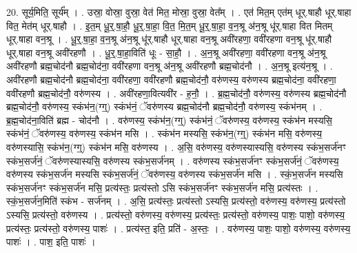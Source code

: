 \documentclass[17pt]{extarticle}
\begin{document}
20. सूर्य॒मिति॒ सूर्य᳚म् । . उस्रा॒ वोस्रा॒ वुस्रा॒ वेत॑ मित॒ मोस्रा॒ वुस्रा॒ वेत᳚म् । . एत॑ मित॒म् एत॑म् धूर्.षाहौ धूर्.षाहा वित॒ मेत॑म् धूर्.षाहौ । . इ॒त॒म् धू॒र्॒.षा॒हौ॒ धू॒र्॒.षा॒हा॒ वि॒त॒ मि॒त॒म् धू॒र्॒.षा॒हा॒ व॒न॒श्रू अ॑न॒श्रू धू॑र्.षाहा वित मितम् धूर्.षाहा वन॒श्रू । . धू॒र्॒.षा॒हा॒ व॒न॒श्रू अ॑न॒श्रू धू॑र्.षाहौ धूर्.षाहा वन॒श्रू अवी॑रहणा॒ ववी॑रहणा वन॒श्रू धू॑र्.षाहौ धूर्.षाहा वन॒श्रू अवी॑रहणौ । . धू॒र्॒.षा॒हा॒विति॑ धूः - सा॒हौ॒ । . अ॒न॒श्रू अवी॑रहणा॒ ववी॑रहणा वन॒श्रू अ॑न॒श्रू अवी॑रहणौ ब्रह्म॒चोद॑नौ ब्रह्म॒चोद॑ना॒ ववी॑रहणा वन॒श्रू अ॑न॒श्रू अवी॑रहणौ ब्रह्म॒चोद॑नौ । . अ॒न॒श्रू इत्य॑न॒श्रू । . अवी॑रहणौ ब्रह्म॒चोद॑नौ ब्रह्म॒चोद॑ना॒ ववी॑रहणा॒ ववी॑रहणौ ब्रह्म॒चोद॑नौ॒ वरु॑णस्य॒ वरु॑णस्य ब्रह्म॒चोद॑ना॒ ववी॑रहणा॒ ववी॑रहणौ ब्रह्म॒चोद॑नौ॒ वरु॑णस्य । . अवी॑रहणा॒वित्यवी॑र - ह॒नौ॒ । . ब्र॒ह्म॒चोद॑नौ॒ वरु॑णस्य॒ वरु॑णस्य ब्रह्म॒चोद॑नौ ब्रह्म॒चोद॑नौ॒ वरु॑णस्य॒ स्कंभ॑न॒(ग्ग्॒) स्कंभ॑नं॒ ॅवरु॑णस्य ब्रह्म॒चोद॑नौ ब्रह्म॒चोद॑नौ॒ वरु॑णस्य॒ स्कंभ॑नम् । . ब्र॒ह्म॒चोद॑ना॒विति॑ ब्रह्म - चोद॑नौ । . वरु॑णस्य॒ स्कंभ॑न॒(ग्ग्॒) स्कंभ॑नं॒ ॅवरु॑णस्य॒ वरु॑णस्य॒ स्कंभ॑न मस्यसि॒ स्कंभ॑नं॒ ॅवरु॑णस्य॒ वरु॑णस्य॒ स्कंभ॑न मसि । . स्कंभ॑न मस्यसि॒ स्कंभ॑न॒(ग्ग्॒) स्कंभ॑न मसि॒ वरु॑णस्य॒ वरु॑णस्यासि॒ स्कंभ॑न॒(ग्ग्॒) स्कंभ॑न मसि॒ वरु॑णस्य । . अ॒सि॒ वरु॑णस्य॒ वरु॑णस्यास्यसि॒ वरु॑णस्य स्कंभ॒सर्ज॑नꣳ स्कंभ॒सर्ज॑नं॒ ॅवरु॑णस्यास्यसि॒ वरु॑णस्य स्कंभ॒सर्ज॑नम् । . वरु॑णस्य स्कंभ॒सर्ज॑नꣳ स्कंभ॒सर्ज॑नं॒ ॅवरु॑णस्य॒ वरु॑णस्य स्कंभ॒सर्ज॑न मस्यसि स्कंभ॒सर्ज॑नं॒ ॅवरु॑णस्य॒ वरु॑णस्य स्कंभ॒सर्ज॑न मसि । . स्कं॒भ॒सर्ज॑न मस्यसि स्कंभ॒सर्ज॑नꣳ स्कंभ॒सर्ज॑न मसि॒ प्रत्य॑स्तः॒ प्रत्य॑स्तो ऽसि स्कंभ॒सर्ज॑नꣳ स्कंभ॒सर्ज॑न मसि॒ प्रत्य॑स्तः । . स्कं॒भ॒सर्ज॑न॒मिति॑ स्कंभ - सर्ज॑नम् । . अ॒सि॒ प्रत्य॑स्तः॒ प्रत्य॑स्तो ऽस्यसि॒ प्रत्य॑स्तो॒ वरु॑णस्य॒ वरु॑णस्य॒ प्रत्य॑स्तो ऽस्यसि॒ प्रत्य॑स्तो॒ वरु॑णस्य । . प्रत्य॑स्तो॒ वरु॑णस्य॒ वरु॑णस्य॒ प्रत्य॑स्तः॒ प्रत्य॑स्तो॒ वरु॑णस्य॒ पाशः॒ पाशो॒ वरु॑णस्य॒ प्रत्य॑स्तः॒ प्रत्य॑स्तो॒ वरु॑णस्य॒ पाशः॑ । . प्रत्य॑स्त॒ इति॒ प्रति॑ - अ॒स्तः॒ । . वरु॑णस्य॒ पाशः॒ पाशो॒ वरु॑णस्य॒ वरु॑णस्य॒ पाशः॑ । . पाश॒ इति॒ पाशः॑ । \newline
\pagebreak
{}
\end{document}
